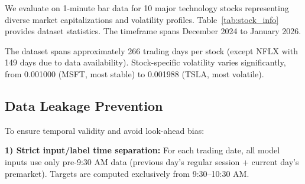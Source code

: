 \documentclass[10pt,conference]{IEEEtran}
\newcommand{\rev}[1]{#1}
\begin{document}
We evaluate on 1-minute bar data for 10 major technology stocks representing diverse market capitalizations and volatility profiles. Table~\ref{tab:stock_info} provides dataset statistics. \rev{The timeframe spans December 2024 to January 2026.}

\begin{table}[t]
\centering
\caption{Dataset Statistics: 10 Technology Stocks}
\label{tab:stock_info}
\end{table}

The dataset spans approximately 266 trading days per stock (except NFLX with 149 days due to data availability). Stock-specific volatility varies significantly, from 0.001000 (MSFT, most stable) to 0.001988 (TSLA, most volatile).

\subsection{Data Leakage Prevention}

To ensure temporal validity and avoid look-ahead bias:

\textbf{1) Strict input/label time separation:} For each trading date, all model inputs use only pre-9:30 AM data (previous day's regular session + current day's premarket). Targets are computed exclusively from 9:30--10:30 AM.
\end{document}
